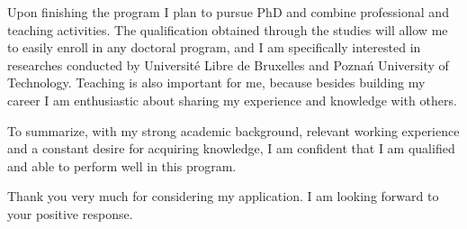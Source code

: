 \documentclass[a4paper,12pt]{article}
\begin{document}
Upon finishing the program I plan to pursue PhD and combine professional and teaching activities. The qualification obtained through the studies will allow me to easily enroll in any doctoral program, and I am specifically interested in researches conducted by Universit\'e Libre de Bruxelles and Pozna\'n University of Technology. Teaching is also important for me, because besides building my career I am enthusiastic about sharing my experience and knowledge with others.

To summarize, with my strong academic background, relevant working experience and a constant desire for acquiring knowledge, I am confident that I am qualified and able to perform well in this program.

Thank you very much for considering my application. I am looking forward to your positive response.
\end{document}
